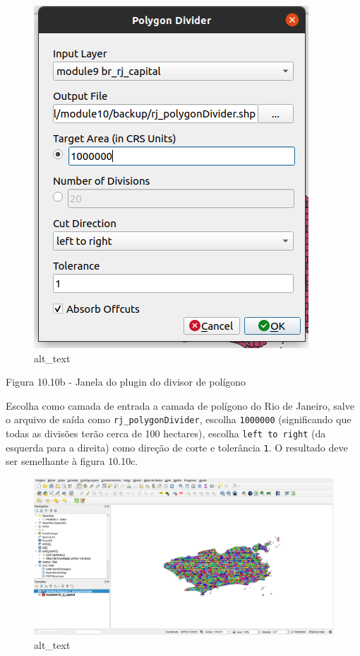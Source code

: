 \documentclass[
]{book}
\begin{document}
\begin{figure}
\centering
\includegraphics{media/modulo10/fig1010_b.png}
\caption{alt\_text}
\end{figure}

Figura 10.10b - Janela do plugin do divisor de polígono

Escolha como camada de entrada a camada de polígono do Rio de Janeiro, salve o arquivo de saída como \texttt{rj\_polygonDivider}, escolha \texttt{1000000} (significando que todas as divisões terão cerca de 100 hectares), escolha \texttt{left\ to\ right} (da esquerda para a direita) como direção de corte e tolerância \texttt{1}. O resultado deve ser semelhante à figura 10.10c.

\begin{figure}
\centering
\includegraphics{media/modulo10/fig1010_c.png}
\caption{alt\_text}
\end{figure}
\end{document}
